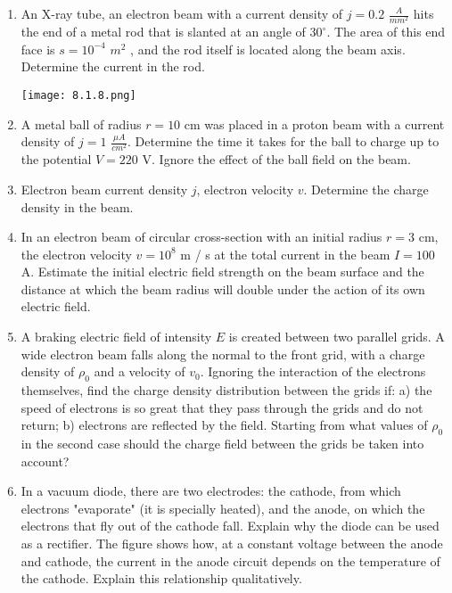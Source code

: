 \documentclass{article}
\begin{document}
\begin{enumerate}[label=8.1.\arabic*]
\item An X-ray tube, an electron beam with a current density of $j = 0.2$ $\frac{A}{mm^2}$ hits the end of a metal rod that is slanted at an angle of $30^\circ$. The area of this end face is $s = 10^{-4}$ $m^2$ , and the rod itself is located along the beam axis. Determine the current in the rod.

\begin{center}
    \texttt{[image: 8.1.8.png]}
\end{center}

\item A metal ball of radius $r = 10$ cm was placed in a proton beam with a current density of $j = 1$ $\frac{\mu A}{cm^2}$. Determine the time it takes for the ball to charge up to the potential $V = 220$ V. Ignore the effect of the ball field on the beam.

\item Electron beam current density $j$, electron velocity $v$. Determine the charge density in the beam.

\item In an electron beam of circular cross-section with an initial radius $r = 3$ cm, the electron velocity $v = 10^8$ m / s at the total current in the beam $I = 100$ A. Estimate the initial electric field strength on the beam surface and the distance at which the beam radius will double under the action of its own electric field.

\item A braking electric field of intensity $E$ is created between two parallel grids. A wide electron beam falls along the normal to the front grid, with a charge density of $\rho_0$ and a velocity of $v_0$. Ignoring the interaction of the electrons themselves, find the charge density distribution between the grids if: a) the speed of electrons is so great that they pass through the grids and do not return; b) electrons are reflected by the field. Starting from what values of $\rho_0$ in the second case should the charge field between the grids be taken into account?

\item In a vacuum diode, there are two electrodes: the cathode, from which electrons "evaporate" (it is specially heated), and the anode, on which the electrons that fly out of the cathode fall. Explain why the diode can be used as a rectifier. The figure shows how, at a constant voltage between the anode and cathode, the current in the anode circuit depends on the temperature of the cathode. Explain this relationship qualitatively.


\end{enumerate}
\end{document}

